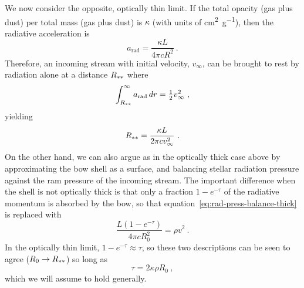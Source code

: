 We now consider the opposite, optically thin limit.  If the total
opacity (gas plus dust) per total mass (gas plus dust) is \(\kappa\) (with
units of \si{cm^2.g^{-1}}), then the radiative acceleration is
\begin{equation}
  \label{eq:rad-accel}
  a_{\text{rad}} = \frac{\kappa L}{4 \pi c R^2} \ .
\end{equation}
Therefore, an incoming stream with initial velocity, \(v_\infty\), can be
brought to rest by radiation alone
at a distance \(R_{**}\) where
\begin{equation}
  \label{eq:rad-poten}
  \int_{R\starstar}^\infty a_{\text{rad}} \, dr = \tfrac12 v_\infty^2 \ , 
\end{equation}
yielding
\begin{equation}
  \label{eq:rad:R0}
  R_{**} = \frac{\kappa L}{2\pi c v_\infty^2} \ .
\end{equation}
On the other hand, we can also argue as in the optically thick case
above by approximating the bow shell as a surface, and balancing
stellar radiation pressure against the ram pressure of the incoming
stream.  The important difference when the shell is not optically
thick is that only a fraction \(1 - e^{-\tau}\) of the radiative momentum
is absorbed by the bow, so that
equation~\eqref{eq:rad-press-balance-thick} is replaced with
\begin{equation}
  \label{eq:rad-press-balance-tau}
  \frac{L (1 - e^{-\tau})}{4 \pi c R_0^2} = \rho v^2 \ .
\end{equation}
In the optically thin limit, \(1 - e^{-\tau} \approx \tau\), so these two
descriptions can be seen to agree (\(R_0 \to R_{**}\)) so long as
\begin{equation}
  \label{eq:tau-thin}
  \tau = 2 \kappa \rho R_0 \ ,
\end{equation}
which we will assume to hold generally.

